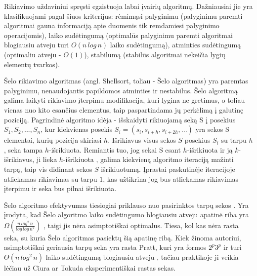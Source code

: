 \documentclass{VUMIFInfKursinis}
\begin{document}
Rikiavimo uždaviniui spręsti egzistuoja labai įvairių algoritmų.
Dažniausiai jie yra klasifikuojami pagal šiuos kriterijus:
rėmimąsi palyginimu (palyginimu paremti algoritmai gauna informaciją apie duomenis tik remdamiesi palyginimo operacijomis),
laiko sudėtingumą (optimalūs palyginimu paremti algoritmai blogiausiu atveju turi $O(n\,log\,n)$ laiko sudėtingumą),
atminties sudėtingumą (optimaliu atveju - $O(1)$),
stabilumą (stabilūs algoritmai nekeičia lygių elementų tvarkos).

Šelo rikiavimo algoritmas (angl. Shellsort, toliau - Šelo algoritmas) \cite{10.1145/368370.368387} yra paremtas palyginimu, nenaudojantis papildomos atminties ir nestabilus.
Šelo algoritmą galima laikyti rikiavimo įterpimu modifikacija,
kuri lygina ne gretimus, o toliau vienas nuo kito esančius elementus, taip paspartindama jų perkėlimą į galutinę poziciją.
Pagrindinė algoritmo idėja - išskaidyti rikiuojamą seką S į posekius $S_1, S_2, ..., S_n$,
kur kiekvienas posekis $S_i = (s_i, s_{i+h}, s_{i+2h}, ...)$ yra sekos S elementai, kurių pozicija skiriasi $h$.
Išrikiavus visus sekos $S$ posekius $S_i$ su tarpu $h$, seka tampa $h$-išrikiuota.
Remiantis tuo, jog sekai S esant $h$-išrikiuota ir ją $k$-išrikiavus, ji lieka $h$-išrikiuota \cite{GALE1972103},
galima kiekvieną algoritmo iteraciją mažinti tarpą, taip vis didinant sekos $S$ išrikiuotumą.
Įprastai paskutinėje iteracijoje atliekamas rikiavimas su tarpu $1$, kas užtikrina jog bus atliekamas
rikiavimas įterpimu ir seka bus pilnai išrikiuota.

Šelo algoritmo efektyvumas tiesiogiai priklauso nuo pasirinktos tarpų sekos \cite{ciura2001best,sedgewick1996analysis}.
Yra įrodyta, kad Šelo algoritmo laiko sudėtingumo blogiausiu atveju apatinė riba yra
$\Omega(\frac{n\,log^2\,n}{log\,log\,n^2})$ \cite{267769}, taigi jis nėra asimptotiškai optimalus.
Tiesa, kol kas nėra rasta seka, su kuria Šelo algoritmas pasiektų šią apatinę ribą.
Kiek žinoma autoriui, asimptotiškai geriausia tarpų seka yra rasta Pratt, kuri yra formos
$2^p3^p$ ir turi $\Theta(n\,log^2\,n)$ laiko sudėtingumą blogiausiu atveju \cite{pratt1972shellsort},
tačiau praktikoje ji veikia lėčiau už Ciura \cite{ciura2001best} ar Tokuda \cite{10.5555/645569.659879} eksperimentiškai rastas sekas.
\end{document}

